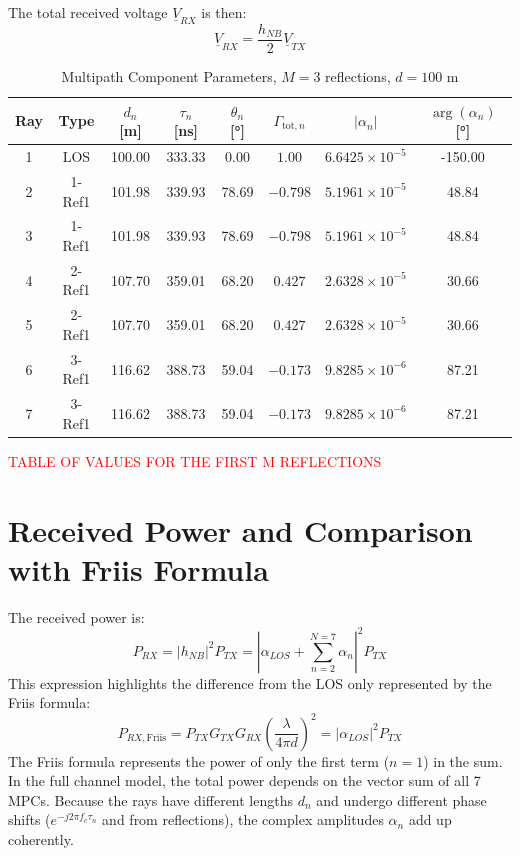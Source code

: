 The total received voltage $\underline{V}_{RX}$ is then:
\begin{equation}
	\underline{V}_{RX} = \frac{h_{NB}}{2} \underline{V}_{TX}
\end{equation}


\begin{table}[h!]
	\centering

	\begin{tabular}{|c|c|c|c|c|c|c|c|}
		\hline
		Ray & Type & $d_n$ [m] & $\tau_n$ [ns] & $\theta_n$ [\si{\degree}] & $\Gamma_{\mathrm{tot},n}$ & $\lvert \alpha_n \rvert$ & $\arg(\alpha_n)$ [\si{\degree}] \\
		\hline
		1 & LOS     & 100.00 & 333.33 & 0.00  & $1.00$  & $6.6425\times 10^{-5}$ & -150.00 \\
		\hline
		2 & 1-Ref1  & 101.98 & 339.93 & 78.69 & $-0.798$ & $5.1961\times 10^{-5}$ & 48.84  \\
		\hline
		3 & 1-Ref1  & 101.98 & 339.93 & 78.69 & $-0.798$ & $5.1961\times 10^{-5}$ & 48.84  \\
		\hline
		4 & 2-Ref1  & 107.70 & 359.01 & 68.20 & $0.427$  & $2.6328\times 10^{-5}$ & 30.66  \\
		\hline
		5 & 2-Ref1  & 107.70 & 359.01 & 68.20 & $0.427$  & $2.6328\times 10^{-5}$ & 30.66  \\
		\hline
		6 & 3-Ref1  & 116.62 & 388.73 & 59.04 & $-0.173$ & $9.8285\times 10^{-6}$ & 87.21  \\
		\hline
		7 & 3-Ref1  & 116.62 & 388.73 & 59.04 & $-0.173$ & $9.8285\times 10^{-6}$ & 87.21  \\
		\hline
	\end{tabular}
		\caption{Multipath Component Parameters, $M = 3$ reflections, $d = 100$ m}
	\label{tab:multipath_parameters}
\end{table}

\textcolor{red}{TABLE OF VALUES FOR THE FIRST M REFLECTIONS}



\section{Received Power and Comparison with Friis Formula}

The received power is:
\begin{equation}
	P_{RX} = |h_{NB}|^2 P_{TX} = \left| \alpha_{LOS} + \sum_{n=2}^{N=7} \alpha_n \right|^2 P_{TX}
\end{equation}
This expression highlights the difference from the LOS only represented by the Friis formula:
\begin{equation}
	P_{RX, \text{Friis}} = P_{TX} G_{TX} G_{RX} \left( \frac{\lambda}{4\pi d} \right)^2 = |\alpha_{LOS}|^2 P_{TX}
\end{equation}
The Friis formula represents the power of only the first term ($n=1$) in the sum. In the full channel model, the total power depends on the vector sum of all 7 MPCs. Because the rays have different lengths $d_n$ and undergo different phase shifts ($e^{-j2\pi f_c \tau_n}$ and from reflections), the complex amplitudes $\alpha_n$ add up coherently.

